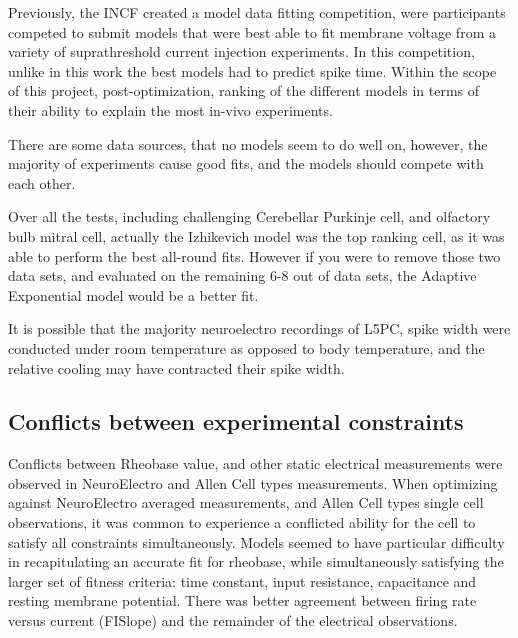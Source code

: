 Previously, the INCF created a model data fitting competition, were participants competed to submit models that were best able to fit membrane voltage from a variety of suprathreshold current injection experiments. In this competition, unlike in this work the best models had to predict spike time. Within the scope of this project, post-optimization, ranking of the different models in terms of their ability to explain the most in-vivo experiments. 

There are some data sources, that no models seem to do well on, however, the majority of experiments cause good fits, and the models should compete with each other.

Over all the tests, including challenging Cerebellar Purkinje cell, and olfactory bulb mitral cell, actually the Izhikevich model was the top ranking cell, as it was able to perform the best all-round fits. However if you were to remove those two data sets, and evaluated on the remaining 6-8 out of data sets, the Adaptive Exponential model would be a better fit.
%

It is possible that the majority neuroelectro recordings of L5PC, spike width were conducted under room temperature as opposed to body temperature, and the relative cooling may have contracted their spike width.
\cite{goldin2017temperature}

\subsection{Conflicts between experimental constraints}

Conflicts between Rheobase value, and other static electrical measurements were observed in NeuroElectro and Allen Cell types measurements. When optimizing against NeuroElectro averaged measurements, and Allen Cell types single cell observations, it was common to experience a conflicted ability for the cell to satisfy all constraints simultaneously. 
Models seemed to have particular difficulty in recapitulating an accurate fit for rheobase, while simultaneously satisfying the larger set of fitness criteria: time constant, input resistance, capacitance and resting membrane potential. There was better agreement between firing rate versus current (FISlope) and the remainder of the electrical observations.


